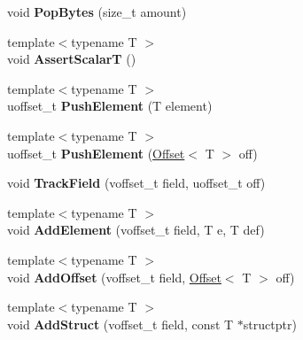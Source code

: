 \begin{DoxyCompactItemize}
void {\bfseries Pop\+Bytes} (size\+\_\+t amount)
\item 
\mbox{\label{classflatbuffers_1_1FlatBufferBuilder_a035b0501d9361db9e2c8a5ba75e81271}} 
{\footnotesize template$<$typename T $>$ }\\void {\bfseries Assert\+ScalarT} ()
\item 
\mbox{\label{classflatbuffers_1_1FlatBufferBuilder_a6c7436cb5a33ef3e1ee81181eabb54b4}} 
{\footnotesize template$<$typename T $>$ }\\uoffset\+\_\+t {\bfseries Push\+Element} (T element)
\item 
\mbox{\label{classflatbuffers_1_1FlatBufferBuilder_a64a80cb4154b007e2d83271828632239}} 
{\footnotesize template$<$typename T $>$ }\\uoffset\+\_\+t {\bfseries Push\+Element} (\hyperlink{structflatbuffers_1_1Offset}{Offset}$<$ T $>$ off)
\item 
\mbox{\label{classflatbuffers_1_1FlatBufferBuilder_a6b996a37c6fe80dbcb5f0885209bbe7b}} 
void {\bfseries Track\+Field} (voffset\+\_\+t field, uoffset\+\_\+t off)
\item 
\mbox{\label{classflatbuffers_1_1FlatBufferBuilder_afc3db5c5a35447b73643b2cd61c06dbd}} 
{\footnotesize template$<$typename T $>$ }\\void {\bfseries Add\+Element} (voffset\+\_\+t field, T e, T def)
\item 
\mbox{\label{classflatbuffers_1_1FlatBufferBuilder_a150264d1b4b4efe0e31285b4fcac99d3}} 
{\footnotesize template$<$typename T $>$ }\\void {\bfseries Add\+Offset} (voffset\+\_\+t field, \hyperlink{structflatbuffers_1_1Offset}{Offset}$<$ T $>$ off)
\item 
\mbox{\label{classflatbuffers_1_1FlatBufferBuilder_a263598624cca61dd385435ddaf399aca}} 
{\footnotesize template$<$typename T $>$ }\\void {\bfseries Add\+Struct} (voffset\+\_\+t field, const T $\ast$structptr)

\end{DoxyCompactItemize}
